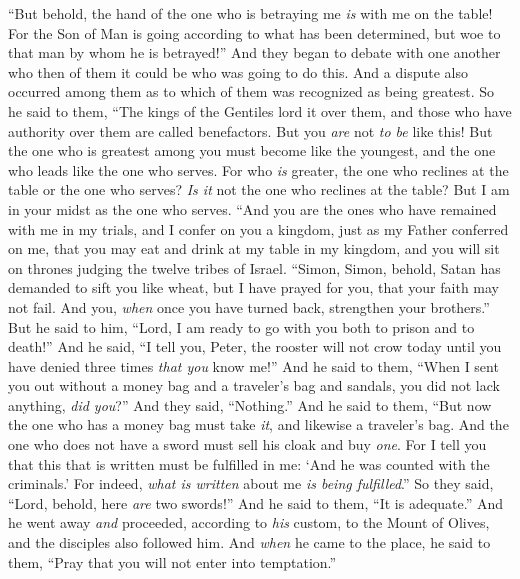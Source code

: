 \begin{biblechapter}
\verse “But behold, the hand of the one who is betraying me \textit{is} with me on the table!
\verse For the Son of Man is going according to what has been determined, but woe to that man by whom he is betrayed!”
\verse And they began to debate with one another who then of them it could be who was going to do this.
 And a dispute also occurred among them as to which of them was recognized as being greatest.
\verse So he said to them, “The kings of the Gentiles lord it over them, and those who have authority over them are called benefactors.
\verse But you \textit{are} not \textit{to be} like this! But the one who is greatest among you must become like the youngest, and the one who leads like the one who serves.
\verse For who \textit{is} greater, the one who reclines at the table or the one who serves? \textit{Is it} not the one who reclines at the table? But I am in your midst as the one who serves.
\verse “And you are the ones who have remained with me in my trials,
\verse and I confer on you a kingdom, just as my Father conferred on me,
\verse that you may eat and drink at my table in my kingdom, and you will sit on thrones judging the twelve tribes of Israel.
 “Simon, Simon, behold, Satan has demanded to sift you like wheat,
\verse but I have prayed for you, that your faith may not fail. And you, \textit{when} once you have turned back, strengthen your brothers.”
\verse But he said to him, “Lord, I am ready to go with you both to prison and to death!”
\verse And he said, “I tell you, Peter, the rooster will not crow today until you have denied three times \textit{that you} know me!”
 And he said to them, “When I sent you out without a money bag and a traveler’s bag and sandals, you did not lack anything, \textit{did you}?” And they said, “Nothing.”
\verse And he said to them, “But now the one who has a money bag must take \textit{it}, and likewise a traveler’s bag. And the one who does not have a sword must sell his cloak and buy \textit{one}.
\verse For I tell you that this that is written must be fulfilled in me: ‘And he was counted with the criminals.’ For indeed, \textit{what is written} about me \textit{is being fulfilled}.”
\verse So they said, “Lord, behold, here \textit{are} two swords!” And he said to them, “It is adequate.”
 And he went away \textit{and} proceeded, according to \textit{his} custom, to the Mount of Olives, and the disciples also followed him.
\verse And \textit{when} he came to the place, he said to them, “Pray that you will not enter into temptation.”

\end{biblechapter}
